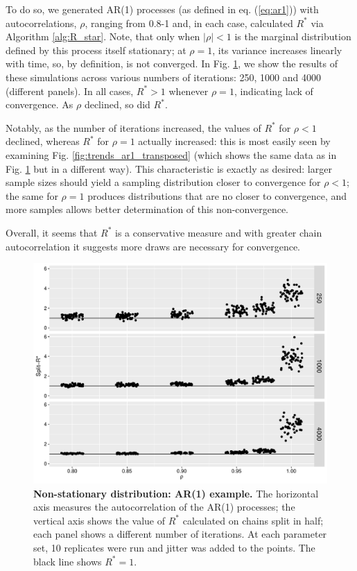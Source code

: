 \documentclass{article}
\begin{document}
To do so, we generated AR(1) processes (as defined in eq. (\ref{eq:ar1})) with autocorrelations, $\rho$, ranging from 0.8-1 and, in each case, calculated $R^*$ via Algorithm \ref{alg:R_star}. Note, that only when $|\rho|<1$ is the marginal distribution defined by this process itself stationary; at $\rho=1$, its variance increases linearly with time, so, by definition, is not converged. In Fig. \ref{fig:trends_ar1}, we show the results of these simulations across various numbers of iterations: 250, 1000 and 4000 (different panels). In all cases, $R^*>1$ whenever $\rho=1$, indicating lack of convergence. As $\rho$ declined, so did $R^*$.

Notably, as the number of iterations increased, the values of $R^*$ for $\rho<1$ declined, whereas $R^*$ for $\rho=1$ actually increased: this is most easily seen by examining Fig. \ref{fig:trends_ar1_transposed} (which shows the same data as in Fig. \ref{fig:trends_ar1} but in a different way). This characteristic is exactly as desired: larger sample sizes should yield a sampling distribution closer to convergence for $\rho<1$; the same for $\rho=1$ produces distributions that are no closer to convergence, and more samples allows better determination of this non-convergence.

Overall, it seems that $R^*$ is a conservative measure and with greater chain autocorrelation it suggests more draws are necessary for convergence.

\begin{figure}[!htb]
	\centerline{\includegraphics[width=1.0\textwidth]{../output/trends_ar1.pdf}}
	\caption{\textbf{Non-stationary distribution: AR(1) example.} The horizontal axis measures the autocorrelation of the AR(1) processes; the vertical axis shows the value of $R^*$ calculated on chains split in half; each panel shows a different number of iterations. At each parameter set, 10 replicates were run and jitter was added to the points. The black line shows $R^*=1$.}
	\label{fig:trends_ar1}
\end{figure}
\end{document}
